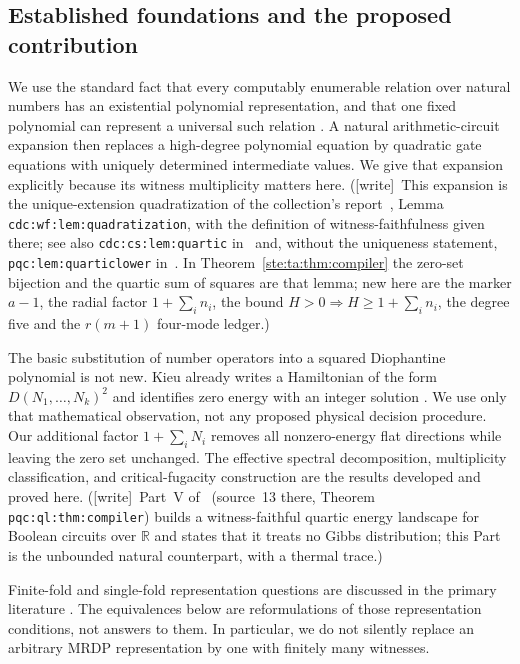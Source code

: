 \documentclass[11pt,letterpaper]{article}
\theoremstyle{definition}
\theoremstyle{remark}
\newcommand{\R}{\mathbb R}
\newcommand{\wtag}{\textup{[write]}}
\begin{document}
\subsection{Established foundations and the proposed contribution}
We use the standard fact that every computably enumerable relation over natural numbers has an existential polynomial representation, and that one fixed polynomial can represent a universal such relation \cite{jones}. A natural arithmetic-circuit expansion then replaces a high-degree polynomial equation by quadratic gate equations with uniquely determined intermediate values. We give that expansion explicitly because its witness multiplicity matters here.
(\wtag\ This expansion is the unique-extension quadratization of the collection's report~\cite{cdc}, Lemma \texttt{cdc:wf:lem:quadratization}, with the definition of witness-faithfulness given there; see also \texttt{cdc:cs:lem:quartic} in~\cite{cdc} and, without the uniqueness statement, \texttt{pqc:lem:quarticlower} in~\cite{pqc}. In Theorem~\ref{ste:ta:thm:compiler} the zero-set bijection and the quartic sum of squares are that lemma; new here are the marker $a-1$, the radial factor $1+\sum_in_i$, the bound $H>0\Rightarrow H\ge1+\sum_in_i$, the degree five and the $r(m+1)$ four-mode ledger.)

The basic substitution of number operators into a squared Diophantine polynomial is not new. Kieu already writes a Hamiltonian of the form $D(N_1,\ldots,N_k)^2$ and identifies zero energy with an integer solution \cite{kieu}. We use only that mathematical observation, not any proposed physical decision procedure. Our additional factor $1+\sum_i N_i$ removes all nonzero-energy flat directions while leaving the zero set unchanged. The effective spectral decomposition, multiplicity classification, and critical-fugacity construction are the results developed and proved here.
(\wtag\ Part~V of~\cite{pqc} (source~13 there, Theorem \texttt{pqc:ql:thm:compiler}) builds a witness-faithful quartic energy landscape for Boolean circuits over $\R$ and states that it treats no Gibbs distribution; this Part is the unbounded natural counterpart, with a thermal trace.)

Finite-fold and single-fold representation questions are discussed in the primary literature \cite{matiyasevichFF,cantone}. The equivalences below are reformulations of those representation conditions, not answers to them. In particular, we do not silently replace an arbitrary MRDP representation by one with finitely many witnesses.
\end{document}
